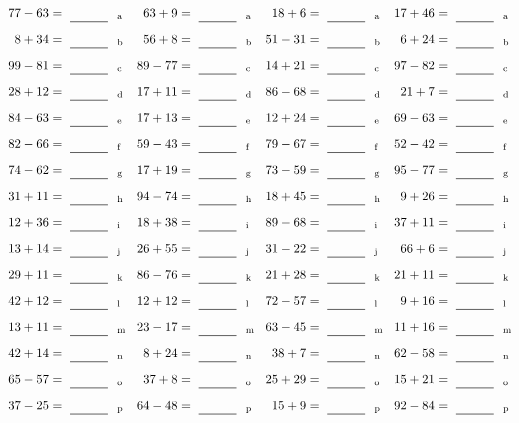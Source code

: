 \documentclass
[
  draft    = true,
  fontsize = 11pt,
  parskip  = half-
]
{scrartcl}
\begin{document}
\clearpage
\begin{align*}
    \pline{77-63}&=\rline{a}
  & \pline{63+9}&=\rline{a}
  & \pline{18+6}&=\rline{a}
  & \pline{17+46}&=\rline{a} \\[1ex]
    \pline{8+34}&=\rline{b}
  & \pline{56+8}&=\rline{b}
  & \pline{51-31}&=\rline{b}
  & \pline{6+24}&=\rline{b} \\[1ex]
    \pline{99-81}&=\rline{c}
  & \pline{89-77}&=\rline{c}
  & \pline{14+21}&=\rline{c}
  & \pline{97-82}&=\rline{c} \\[1ex]
    \pline{28+12}&=\rline{d}
  & \pline{17+11}&=\rline{d}
  & \pline{86-68}&=\rline{d}
  & \pline{21+7}&=\rline{d} \\[1ex]
    \pline{84-63}&=\rline{e}
  & \pline{17+13}&=\rline{e}
  & \pline{12+24}&=\rline{e}
  & \pline{69-63}&=\rline{e} \\[1ex]
    \pline{82-66}&=\rline{f}
  & \pline{59-43}&=\rline{f}
  & \pline{79-67}&=\rline{f}
  & \pline{52-42}&=\rline{f} \\[1ex]
    \pline{74-62}&=\rline{g}
  & \pline{17+19}&=\rline{g}
  & \pline{73-59}&=\rline{g}
  & \pline{95-77}&=\rline{g} \\[1ex]
    \pline{31+11}&=\rline{h}
  & \pline{94-74}&=\rline{h}
  & \pline{18+45}&=\rline{h}
  & \pline{9+26}&=\rline{h} \\[1ex]
    \pline{12+36}&=\rline{i}
  & \pline{18+38}&=\rline{i}
  & \pline{89-68}&=\rline{i}
  & \pline{37+11}&=\rline{i} \\[1ex]
    \pline{13+14}&=\rline{j}
  & \pline{26+55}&=\rline{j}
  & \pline{31-22}&=\rline{j}
  & \pline{66+6}&=\rline{j} \\[1ex]
    \pline{29+11}&=\rline{k}
  & \pline{86-76}&=\rline{k}
  & \pline{21+28}&=\rline{k}
  & \pline{21+11}&=\rline{k} \\[1ex]
    \pline{42+12}&=\rline{l}
  & \pline{12+12}&=\rline{l}
  & \pline{72-57}&=\rline{l}
  & \pline{9+16}&=\rline{l} \\[1ex]
    \pline{13+11}&=\rline{m}
  & \pline{23-17}&=\rline{m}
  & \pline{63-45}&=\rline{m}
  & \pline{11+16}&=\rline{m} \\[1ex]
    \pline{42+14}&=\rline{n}
  & \pline{8+24}&=\rline{n}
  & \pline{38+7}&=\rline{n}
  & \pline{62-58}&=\rline{n} \\[1ex]
    \pline{65-57}&=\rline{o}
  & \pline{37+8}&=\rline{o}
  & \pline{25+29}&=\rline{o}
  & \pline{15+21}&=\rline{o} \\[1ex]
    \pline{37-25}&=\rline{p}
  & \pline{64-48}&=\rline{p}
  & \pline{15+9}&=\rline{p}
  & \pline{92-84}&=\rline{p}
\end{align*}
\end{document}
